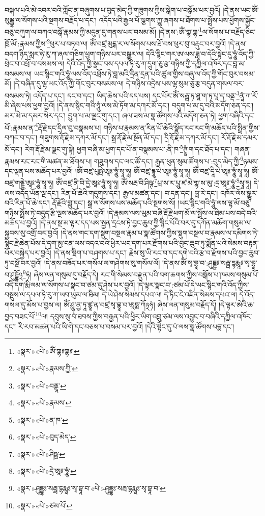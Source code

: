 བསྐལ་པའི་མེ་འབར་བའི་ཀློང་ན་བཞུགས་པ་བུད་མེད་ཀྱི་གཟུགས་ཀྱིས་སྒེག་པ་བསྒོམ་པར་བྱའོ། །དེ་ནས་ཡང་ཨོཾ་སུམྦྷ་ལ་སོགས་པའི་སྔགས་བརྗོད་པ་དང་། འདོད་པའི་རྒྱལ་པོ་ལྕགས་ཀྱུ་ཞགས་པ་ཐོགས་པ་སྤྲོས་པས་ཕྱོགས་སྐྱོང་བཅུ་བཀུག་ལ་བཀའ་བསྒོ་རྣམས་ཀྱི་མདུན་དུ་གནས་པར་བསམ་མོ། །དེ་ནས་:ཨོཾ་གྷ་གྷ་\footnote{«སྣར་»«པེ་»ཨོཾ་གྷཿགྷཿ་}ལ་སོགས་པ་བརྗོད་ཅིང་ཁྲོ་མོ་:རྣམས་ཀྱིས་\footnote{«སྣར་»«པེ་»རྣམས་ཀྱི་}ཕུར་པ་བཏབ་ལ། ཨོཾ་བཛྲ་མུངྒ་ར་ལ་སོགས་པས་ཐོ་བས་ཕུར་བུ་བརྡུང་བར་བྱའོ། །དེ་ནས་བདག་ཉིད་སླར་ཧེ་རུ་ཀ་ཞལ་གཅིག་ཕྱག་གཉིས་པར་བསྒྱུར་ལ། དེའི་སྙིང་གར་ཨ་ལས་ཟླ་བ་དེའི་སྟེང་དུ་ཧཱུཾ་འོད་ཀྱི་ཕྲེང་བ་འཕྲོ་བ་བསམས་ལ། དེའི་འོད་ཀྱི་སྣང་བས་དཔལ་ཧེ་རུ་ཀ་དྲུག་ཅུ་རྩ་གཉིས་ཀྱི་དཀྱིལ་འཁོར་དང་བླ་མ་བསམས་ལ། ཡང་སྙིང་གའི་ཧཱུཾ་ལས་འོད་འཕྲོས་ཏེ་བླ་མའི་དྲིན་དྲན་པའི་ཚུལ་གྱིས་བཞུ་ལ་འོད་ཀྱི་གོང་བུར་བསམ་མོ། །དེ་བཞིན་དུ་ལྷ་ཡང་འོད་ཀྱི་གོང་བུར་བསམས་ལ། དེ་གཉིས་འདྲེས་པས་ལྷ་སུམ་ཅུ་རྩ་བདུན་གསལ་བར་བསམས་ཏེ། འདོད་པ་དང་། དང་བ་དང་། ཡིད་ཆེས་པའི་དད་པས། དང་པོར་ཨོཾ་སརྦྦ་ཏ་ཐཱ་ག་ཏ་པཱ་ད་བནྡ་\footnote{«སྣར་»«པེ་»བནྡཱ་}ནཱཾ་ཀ་རོ་མི་ཞེས་པས་ཕྱག་བྱའོ། །དེ་ནས་སྙིང་གའི་ཧཱུཾ་ལས་མེ་ཏོག་མ་དཀར་མོ་དང་། བདུག་པ་མ་དུ་བའི་མདོག་ཅན་དང་། མར་མེ་མ་དམར་སེར་དང་། བྱུག་པ་མ་ལྗང་གུ་དང་། ཞལ་ཟས་མ་སྣ་ཚོགས་པའི་མདོག་ཅན་ཏེ། ཕྱག་བཞིའི་དང་པོ་:རྣམས་ན་\footnote{«སྣར་»«པེ་»རྣམས་}རྡོ་རྗེ་དང་དྲིལ་བུ་བསྣམས་པ། གཉིས་པ་རྣམས་ན་རིན་པོ་ཆེའི་སྣོད་རང་རང་གི་མཆོད་པའི་སྤྲིན་གྱིས་བཀང་བ་དང་། གཟུགས་རྡོ་རྗེ་མ་དཀར་མོ་དང་། སྒྲ་རྡོ་རྗེ་མ་སྔོན་མོ་དང་། དྲི་རྡོ་རྗེ་མ་དཀར་མོ་དང་། རོ་རྡོ་རྗེ་མ་དམར་མོ་དང་། རེག་རྡོ་རྗེ་མ་ལྗང་གུ་སྟེ། ཕྱག་བཞི་མ་ཕྱག་དང་པོ་ན་བསྣམས་པ་:ནི་ཁ་\footnote{«སྣར་»«པེ་»ན་ཁ་}ཊྭཱཾ་ག་དང་ཐོད་པ་དང་། གཞན་རྣམས་རང་རང་གི་མཚན་མ་ཐོགས་པ། གཟུགས་དང་ལང་ཚོ་དང་། རྒྱན་ཕུན་སུམ་ཚོགས་པ་:བུད་མེད་ཀྱི་\footnote{«སྣར་»«པེ་»བུད་མེད་}ཉམས་དང་ལྡན་པས་མཆོད་པར་བྱའོ། །ཨོཾ་བཛྲ་པུཥྤེ་ཨཱཿ་ཧཱུཾ་སྭཱ་ཧཱ། ཨོཾ་བཛྲ་དྷཱུ་པེ་ཨཱཿ་ཧཱུཾ་སྭཱ་ཧཱ། ཨོཾ་བཛྲ་དཱི་པེ་ཨཱཿ་ཧཱུཾ་སྭཱ་ཧཱ། ཨོཾ་བཛྲ་གནྡྷེ་ཨཱཿ་ཧཱུཾ་སྭཱ་ཧཱ། ཨོཾ་བཛྲ་ནི་བི་དྱེ་ཨཱཿ་ཧཱུཾ་སྭཱ་ཧཱ། ཨོཾ་སརྦ་བི་ཤིཥྚ་\footnote{«སྣར་»«པེ་»ཤིཥྛ་}པྲ་ས་ར་པཱུ་ཛ་མེ་གྷ་ས་མུ་:དྲ་ཨཱཿ་ཧཱུཾ་\footnote{«སྣར་»«པེ་»དྲེ་ཨཱཿ་ཧཱུཾ་}སྭཱ་ཧཱ། དེ་ལས་འདོད་ཡོན་ལྔ་དང་། རིན་པོ་ཆེའི་གདུགས་དང་། རྒྱལ་མཚན་དང་། བ་དན་དང་། བླ་རེ་དང་། འཁོར་ལོས་སྒྱུར་བའི་རིན་པོ་ཆེ་དང་། རྡོ་རྗེའི་གླུ་དང་། སྒྲ་ལ་སོགས་པས་མཆོད་པའི་སྔགས་སོ། །ཡང་སྙིང་གའི་ཧཱུཾ་ལས་ལྷ་མོ་བཅུ་གཉིས་སྤྲོས་ཏེ་བདུད་རྩི་ལྔས་མཆོད་པར་བྱའོ། །དེ་རྣམས་ལས་ཡུམ་བཞི་རྡོ་རྗེ་ཕག་མོ་ལ་སྤྲོས་ལ་ཐིམ་པས་བདེ་བའི་མཆོད་པ་བྱའོ། །དེ་ནས་སྔ་མ་ལྟར་དད་པས་སྤྱན་དྲངས་ཏེ་བྱང་ཆུབ་ཀྱི་སྙིང་པོའི་བར་དུ་དཀོན་མཆོག་གསུམ་ལ་སྐྱབས་སུ་འགྲོ་བར་བྱའོ། །དེ་ནས་གང་དག་སྡུག་བསྔལ་རྣམ་པ་སྣ་ཚོགས་ཀྱིས་སྡུག་བསྔལ་བ་རྣམས་ལ་དམིགས་ཏེ་སྙིང་རྗེ་ཆེན་པོས་དེ་དག་མྱ་ངན་ལས་འདའ་བའི་ཕྱིར་ཡང་དག་པར་རྫོགས་པའི་བྱང་ཆུབ་ཏུ་སྨོན་པའི་སེམས་བརྟན་པོར་བསྐྱེད་པར་བྱའོ། །དེ་ནས་སྡིག་པ་བཤགས་པ་དང་། རྗེས་སུ་ཡི་རང་བ་དང་དགེ་བའི་རྩ་བ་རྫོགས་པའི་བྱང་ཆུབ་ཏུ་བསྔོ་བར་བྱའོ། །དེ་ནས་བཟོད་པར་གསོལ་ལ་གཤེགས་སུ་གསོལ་ལོ། །དེ་ནས་ཨོཾ་སྭ་བྷཱ་བ་:ཤུདྡྷཿ་སརྦྦ་དྷརྨཱཿ་སྭ་བྷཱ་བ་ཤུདྡྷོ྅\footnote{«སྣར་»ཤུདྡྷཿ་སརྦྦ་དྷརྨཱཿ་སྭ་བྷཱ་བ་«པེ་»ཤུདྡྷཿ་སརྦ་དྷརྨཱཿ་སྭ་བྷཱ་བ་}ཧཾ། ཞེས་ལན་གསུམ་དུ་བརྗོད་དེ། རང་གི་སེམས་བརྫུན་པའི་བག་ཆགས་ཀྱིས་བསྒོས་པ་ཁམས་གསུམ་པོ་འདི་དག་རྨི་ལམ་ལ་སོགས་པ་སྣང་བ་ཙམ་དུ་ཤེས་པར་བྱའོ། །དེ་ལྟར་སྣང་བ་:ཙམ་པོ་དེ་ཡང་སྙིང་གའི་འོད་ཀྱིས་བསྡུས་ལ་དཔལ་ཧེ་རུ་ཀ་ཡབ་ཡུམ་ལ་ཐིམ། དེ་ཡེ་ཤེས་སེམས་དཔའ་ལ། དེ་ཏིང་ངེ་འཛིན་སེམས་དཔའ་ལ། དེ་འོད་གསལ་དུ་མོས་པ་བྱས་ལ། ཨོཾ་ཤཱུ་ནྱ་ཏཱ་ཛྙཱ་ན་བཛྲ་སྭ་བྷཱ་བ་ཨཱཏྨ་ཀོ྅ཧཾ། ཞེས་ལན་གསུམ་བརྗོད་དོ། །དེ་ལྟར་ཨེའི་ཆ་བྱད་བཟང་པོ་\footnote{«སྣར་»«པེ་»ཙམ་པོ་}ལ། དབུས་སུ་བཾ་ཐབས་ཀྱིས་བརྒྱན་པའི་ཕྱིར་ཡིག་འབྲུ་ཙམ་ལས་འབྱུང་བ་བཞིའི་དཀྱིལ་འཁོར་དང་། རི་རབ་མཚན་པའི་ཡི་གེ་དང་བཅས་པ་བསམ་པར་བྱའོ། །དེའི་སྟེང་དུ་པཾ་ལས་སྣ་ཚོགས་པདྨ་དང་། 